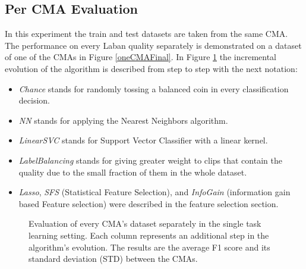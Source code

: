 \documentclass[11pt,twocolumn,varwidth=true,a4paper,fleqn]{article}
\begin{document}
\subsection{Per CMA Evaluation}
	In this experiment the train and test datasets are taken from the same
	CMA. The performance on every Laban quality separately 	is demonstrated on 
	a dataset of one of the CMAs in Figure \ref{oneCMAFinal}.
	In Figure \ref{oneCMASummary} the incremental evolution of the algorithm is 
	described from step to step with the next notation:
	\begin{itemize}
	\item 
	\textit{Chance} stands for randomly tossing a balanced coin in every
	classification decision.
	\item 
	\textit{NN} stands for applying the Nearest Neighbors algorithm.
	\item 
	\textit{LinearSVC} stands for Support Vector Classifier with a linear
	kernel.
	\item 
	\textit{LabelBalancing} stands for giving greater weight to clips that
	contain the quality due to the small fraction of them in the whole
	dataset.
	\item 
	\textit{Lasso}, \textit{SFS} (Statistical Feature Selection), and \textit{InfoGain} (information gain
	based Feature selection) were described in the feature selection section.
	\end{itemize}


\begin{figure}[ht]
\centering   
{}
\caption{Evaluation of every CMA's dataset separately in the single task learning
		setting. Each column represents an additional step in the algorithm's evolution.
		The results are the average F1 score and its standard deviation (STD) between the CMAs.}
\label{oneCMASummary}
\end{figure}
  
\end{document}
